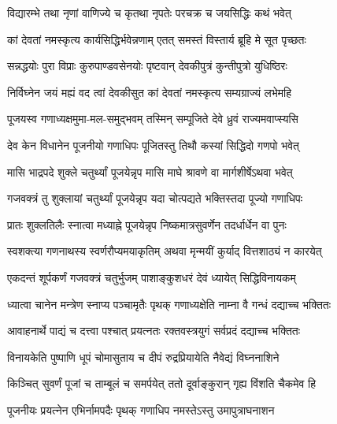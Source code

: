 \begin{center}
\twolineshloka
{विद्यारम्भे तथा नृणां वाणिज्ये च कृतथा}
{नृपतेः परचक्र च जयसिद्धिः कथं भवेत्}%

\twolineshloka
{कां देवतां नमस्कृत्य कार्यसिद्धिर्भवेन्नणाम्}
{एतत् समस्तं विस्तार्य ब्रूहि मे सूत पृच्छतः}%

\twolineshloka
{सन्नद्धयोः पुरा विप्राः कुरुपाण्डवसेनयोः}
{पृष्टवान् देवकीपुत्रं कुन्तीपुत्रो युधिष्ठिरः}%


\twolineshloka
{निर्विघ्नेन जयं मह्यं वद त्वां देवकीसुत}
{कां देवतां नमस्कृत्य सम्यग्राज्यं लभेमहि}%


\twolineshloka
{पूजयस्व गणाध्यक्षमुमा-मल-समुद्भवम्}
{तस्मिन् सम्पूजिते देवे ध्रुवं राज्यमवाप्स्यसि}%


\twolineshloka
{देव केन विधानेन पूजनीयो गणाधिपः}
{पूजितस्तु तिथौ कस्यां सिद्धिदो गणपो भवेत्}%


\twolineshloka
{मासि भाद्रपदे शुक्ले चतुर्थ्यां पूजयेन्नृप}
{मासि माघे श्रावणे वा मार्गशीर्षेऽथवा भवेत्}%

\twolineshloka
{गजवक्त्रं तु शुक्लायां चतुर्थ्यां पूजयेन्नृप}
{यदा चोत्पद्यते भक्तिस्तदा पूज्यो गणाधिपः}%

\twolineshloka
{प्रातः शुक्लतिलैः स्नात्वा मध्याह्ने पूजयेन्नृप}
{निष्कमात्रसुवर्णेन तदर्धार्धेन वा पुनः}%

\twolineshloka
{स्वशक्त्या गणनाथस्य स्वर्णरौप्यमयाकृतिम्}
{अथवा मृन्मयीं कुर्याद् वित्तशाठ्यं न कारयेत्}%

\twolineshloka
{एकदन्तं शूर्पकर्णं गजवक्त्रं चतुर्भुजम्}
{पाशाङ्कुशधरं देवं ध्यायेत् सिद्धिविनायकम्}%

\twolineshloka
{ध्यात्वा चानेन मन्त्रेण स्नाप्य पञ्चामृतैः पृथक्}
{गणाध्यक्षेति नाम्ना वै गन्धं दद्याच्च भक्तितः}%

\twolineshloka
{आवाहनार्थे पाद्यं च दत्त्वा पश्चात् प्रयत्नतः}
{रक्तवस्त्रयुगं सर्वप्रदं दद्याच्च भक्तितः}%

\twolineshloka
{विनायकेति पुष्पाणि धूपं चोमासुताय च}
{दीपं रुद्रप्रियायेति नैवेद्यं विघ्ननाशिने}%

\twolineshloka
{किञ्चित् सुवर्णं पूजां च ताम्बूलं च समर्पयेत्}
{ततो दूर्वाङ्कुरान् गृह्य विंशति चैकमेव हि}%

\twolineshloka
{पूजनीयः प्रयत्नेन एभिर्नामपदैः पृथक्}
{गणाधिप नमस्तेऽस्तु उमापुत्राघनाशन}%


\end{center}

